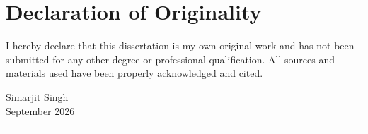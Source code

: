 \chapter*{Declaration of Originality}

I hereby declare that this dissertation is my own original work and has not been submitted for any other degree or professional qualification. All sources and materials used have been properly acknowledged and cited.

\vspace{2cm}
Simarjit Singh \\
September 2026 \\
\noindent\rule{6cm}{0.4pt} \\